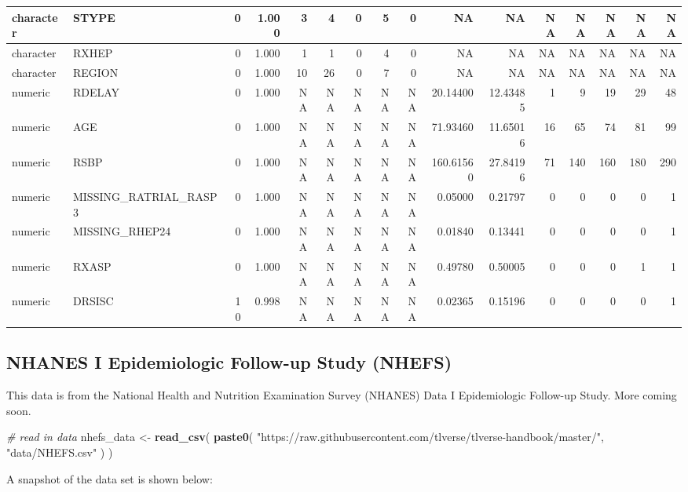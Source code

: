\documentclass[12pt, krantz2,]{krantz}
\newenvironment{Shaded}{\begin{snugshade}}{\end{snugshade}}
\newcommand{\CommentTok}[1]{\textcolor[rgb]{0.37,0.37,0.37}{\textit{#1}}}
\newcommand{\KeywordTok}[1]{\textcolor[rgb]{0.27,0.27,0.27}{\textbf{#1}}}
\newcommand{\NormalTok}[1]{#1}
\newcommand{\StringTok}[1]{\textcolor[rgb]{0.5,0.5,0.5}{#1}}
\theoremstyle{definition}
\theoremstyle{definition}
\theoremstyle{definition}
\newcommand{\1}{\mathbbm{1}}
\begin{document}
\begin{tabular}{l|l|r|r|r|r|r|r|r|r|r|r|r|r|r|r}
\hline
character & STYPE & 0 & 1.000 & 3 & 4 & 0 & 5 & 0 & NA & NA & NA & NA & NA & NA & NA\\
\hline
character & RXHEP & 0 & 1.000 & 1 & 1 & 0 & 4 & 0 & NA & NA & NA & NA & NA & NA & NA\\
\hline
character & REGION & 0 & 1.000 & 10 & 26 & 0 & 7 & 0 & NA & NA & NA & NA & NA & NA & NA\\
\hline
numeric & RDELAY & 0 & 1.000 & NA & NA & NA & NA & NA & 20.14400 & 12.43485 & 1 & 9 & 19 & 29 & 48\\
\hline
numeric & AGE & 0 & 1.000 & NA & NA & NA & NA & NA & 71.93460 & 11.65016 & 16 & 65 & 74 & 81 & 99\\
\hline
numeric & RSBP & 0 & 1.000 & NA & NA & NA & NA & NA & 160.61560 & 27.84196 & 71 & 140 & 160 & 180 & 290\\
\hline
numeric & MISSING\_RATRIAL\_RASP3 & 0 & 1.000 & NA & NA & NA & NA & NA & 0.05000 & 0.21797 & 0 & 0 & 0 & 0 & 1\\
\hline
numeric & MISSING\_RHEP24 & 0 & 1.000 & NA & NA & NA & NA & NA & 0.01840 & 0.13441 & 0 & 0 & 0 & 0 & 1\\
\hline
numeric & RXASP & 0 & 1.000 & NA & NA & NA & NA & NA & 0.49780 & 0.50005 & 0 & 0 & 0 & 1 & 1\\
\hline
numeric & DRSISC & 10 & 0.998 & NA & NA & NA & NA & NA & 0.02365 & 0.15196 & 0 & 0 & 0 & 0 & 1\\
\hline
\end{tabular}

\hypertarget{NHEFS}{%
\subsection{NHANES I Epidemiologic Follow-up Study (NHEFS)}\label{NHEFS}}

This data is from the National Health and Nutrition Examination Survey (NHANES)
Data I Epidemiologic Follow-up Study. More coming soon.

\begin{Shaded}
\begin{Highlighting}[]
\CommentTok{# read in data}
\NormalTok{nhefs_data <-}\StringTok{ }\KeywordTok{read_csv}\NormalTok{(}
  \KeywordTok{paste0}\NormalTok{(}
    \StringTok{"https://raw.githubusercontent.com/tlverse/tlverse-handbook/master/"}\NormalTok{,}
    \StringTok{"data/NHEFS.csv"}
\NormalTok{  )}
\NormalTok{)}
\end{Highlighting}
\end{Shaded}

A snapshot of the data set is shown below:
\end{document}
